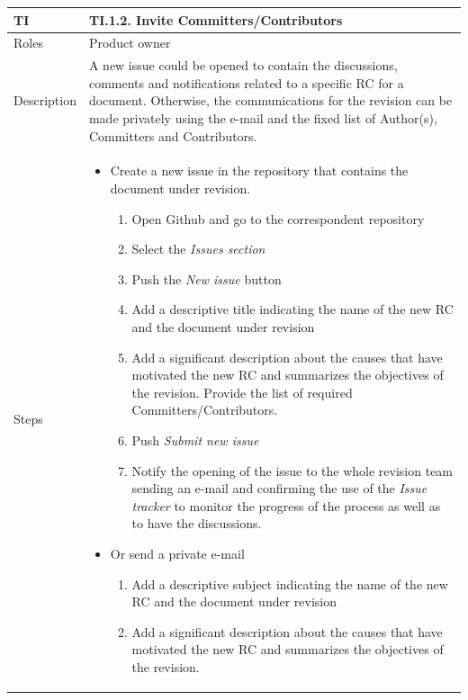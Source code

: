 \documentclass{template/openetcs_article}
\begin{document}
\begin{flushleft}
\tablefirsthead{}
\tablehead{}
\tabletail{}
\tablelasttail{}
\begin{supertabular}{|m{2cm}|m{13cm}|}
\hline
{}
TI & 
TI.1.2. Invite Committers/Contributors
\\\hline
Roles &
Product owner
\\\hline
Description &
A new issue could be opened to contain the discussions, comments and notifications related to a specific RC for a document. Otherwise, the communications for the revision can be made privately using the e-mail and the fixed list of Author(s), Committers and Contributors. 
\\\hline
Steps &
\begin{itemize}
\item Create a new issue in the repository that contains the document under revision. 
\begin{enumerate}
   \item Open Github and go to the correspondent repository
   \item Select the {\it Issues section}
   \item Push the {\it New issue} button
   \item Add a descriptive title indicating the name of the new RC and the document under revision
   \item Add a significant description about the causes that have motivated the new RC and summarizes the objectives of the revision. Provide the list of required Committers/Contributors.
   	\item Push {\it Submit new issue}
   	\item Notify the opening of the issue to the whole revision team sending an e-mail and confirming the use of the {\it Issue tracker} to monitor the progress of the process as well as to have the discussions.
\end{enumerate}
\item Or send a private e-mail
\begin{enumerate}
   \item Add a descriptive subject indicating the name of the new RC and the document under revision
   \item Add a significant description about the causes that have motivated the new RC and summarizes the objectives of the revision. 
\end{enumerate}
\end{itemize}
\\\hline
\end{supertabular}
\end{flushleft}
\end{document}
